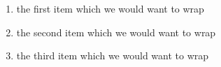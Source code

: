 
\begin{enumerate}
  \item the first item which we would want to wrap
  \item the second item which we would want to wrap
  \item the third item which we would want to wrap
\end{enumerate}

